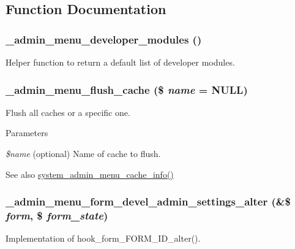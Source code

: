 \subsection{Function Documentation}
\hypertarget{admin__menu_8inc_adc75f56f673a11494a4ed92d15e04cdf}{
\subsubsection[{\_\-admin\_\-menu\_\-developer\_\-modules}]{\setlength{\rightskip}{0pt plus 5cm}\_\-admin\_\-menu\_\-developer\_\-modules ()}}
\label{admin__menu_8inc_adc75f56f673a11494a4ed92d15e04cdf}
Helper function to return a default list of developer modules. \hypertarget{admin__menu_8inc_a34a792a4ac923bf39cf8e8f87fb92124}{
\subsubsection[{\_\-admin\_\-menu\_\-flush\_\-cache}]{\setlength{\rightskip}{0pt plus 5cm}\_\-admin\_\-menu\_\-flush\_\-cache (\$ {\em name} = {\ttfamily NULL})}}
\label{admin__menu_8inc_a34a792a4ac923bf39cf8e8f87fb92124}
Flush all caches or a specific one.


\begin{DoxyParams}{Parameters}
\item[{\em \$name}](optional) Name of cache to flush.\end{DoxyParams}
\begin{DoxySeeAlso}{See also}
\hyperlink{admin__menu_8inc_addfcc1ff94f62409d4ff7fa7f523aa45}{system\_\-admin\_\-menu\_\-cache\_\-info()} 
\end{DoxySeeAlso}
\hypertarget{admin__menu_8inc_aa78509bb044821faf77cf6624bd726f8}{
\subsubsection[{\_\-admin\_\-menu\_\-form\_\-devel\_\-admin\_\-settings\_\-alter}]{\setlength{\rightskip}{0pt plus 5cm}\_\-admin\_\-menu\_\-form\_\-devel\_\-admin\_\-settings\_\-alter (\&\$ {\em form}, \/  \$ {\em form\_\-state})}}
\label{admin__menu_8inc_aa78509bb044821faf77cf6624bd726f8}
Implementation of hook\_\-form\_\-FORM\_\-ID\_\-alter().


